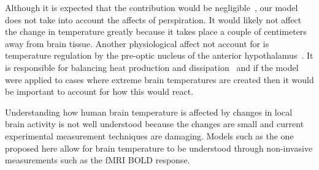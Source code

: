 Although it is expected that the contribution would be negligible~\citep{nadel1971}, our model does not take into account the affects of perspiration. It would likely not affect the change in temperature greatly because it takes place a couple of centimeters away from brain tissue.  Another physiological affect not account for is temperature regulation by the pre-optic nucleus of the anterior hypothalamus~\citep{bertolizio2011}. It is responsible for balancing heat production and dissipation~\citep{simon1993} and if the model were applied to cases where extreme brain temperatures are created then it would be important to account for how this would react.

Understanding how human brain temperature is affected by changes in local brain activity is not well understood because the changes are small and current experimental measurement techniques are damaging. Models such as the one proposed here allow for brain temperature to be understood through non-invasive measurements such as the fMRI BOLD response.


